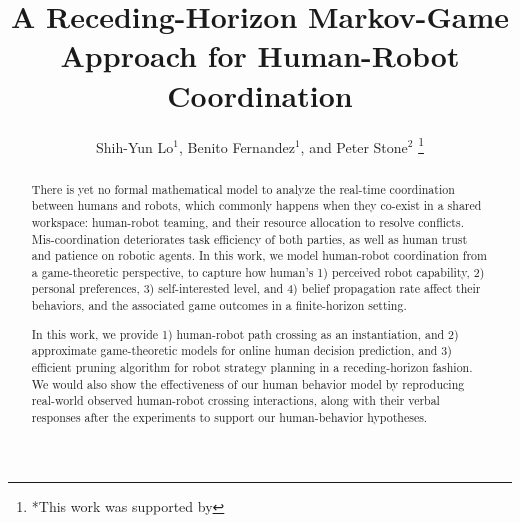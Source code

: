 \documentclass[letterpaper, 10 pt, conference]{ieeeconf}  %
\title{\LARGE \bf
A Receding-Horizon Markov-Game Approach for Human-Robot Coordination
}
\author{Shih-Yun Lo$^{1}$, Benito Fernandez$^{1}$, and Peter Stone$^{2}$%
\thanks{*This work was supported by }%
}
\begin{document}
\maketitle
\thispagestyle{empty}
\pagestyle{empty}
\begin{abstract}
There is yet no formal mathematical model to analyze the real-time coordination between humans and robots, which commonly happens when they co-exist in a shared workspace: human-robot teaming, and their resource allocation to resolve conflicts. Mis-coordination deteriorates task efficiency of both parties, as well as human trust and patience on robotic agents. In this work, we model human-robot coordination from a game-theoretic perspective, to capture how human's 1) perceived robot capability, 2) personal preferences, 3) self-interested level, and 4) belief propagation rate affect their behaviors, and the associated game outcomes in a finite-horizon setting. 

In this work, we provide 1) human-robot path crossing as an instantiation, and 2) approximate game-theoretic models for online human decision prediction, and 3) efficient pruning algorithm for robot strategy planning in a receding-horizon fashion. We would also show the effectiveness of our human behavior model by reproducing real-world observed human-robot crossing interactions, along with their verbal responses after the experiments to support our human-behavior hypotheses. 
\end{abstract}








\end{document}
